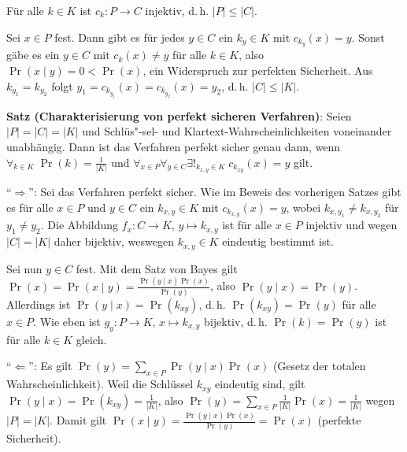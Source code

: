 \begin{Beweis}
    Für alle $k \in K$ ist $c_k\colon P \rightarrow C$ injektiv, d.\,h. $|P| \le |C|$.

    Sei $x \in P$ fest.
    Dann gibt es für jedes $y \in C$ ein $k_y \in K$ mit $c_{k_y}(x) = y$.
    Sonst gäbe es ein $y \in C$ mit $c_k(x) \not= y$ für alle $k \in K$,
    also $\Pr(x \;|\; y) = 0 < \Pr(x)$, ein Widerspruch zur perfekten Sicherheit.
    Aus $k_{y_1} = k_{y_2}$ folgt $y_1 = c_{k_{y_1}}(x) = c_{k_{y_2}}(x) = y_2$,
    d.\,h. $|C| \le |K|$.
\end{Beweis}

\linie

\textbf{Satz (Charakterisierung von perfekt sicheren Verfahren)}:
Seien  $|P| = |C| = |K|$ und Schlüs"-sel- und Klartext-Wahrscheinlichkeiten voneinander unabhängig.
Dann ist das Verfahren perfekt sicher genau dann, wenn
$\forall_{k \in K}\; \Pr(k) = \frac{1}{|K|}$ und
$\forall_{x \in P} \forall_{y \in C} \exists!_{k_{x,y} \in K}\; c_{k_{xy}}(x) = y$ gilt.

\begin{Beweis}
    "`$\Rightarrow$"':
    Sei das Verfahren perfekt sicher.
    Wie im Beweis des vorherigen Satzes gibt es für alle $x \in P$ und $y \in C$ ein
    $k_{x,y} \in K$ mit $c_{k_{x,y}}(x) = y$,
    wobei $k_{x,y_1} \not= k_{x,y_2}$ für $y_1 \not= y_2$.
    Die Abbildung $f_x\colon C \rightarrow K$, $y \mapsto k_{x,y}$ ist für alle $x \in P$
    injektiv und wegen $|C| = |K|$ daher bijektiv, weswegen $k_{x,y} \in K$ eindeutig bestimmt ist.

    Sei nun $y \in C$ fest.
    Mit dem Satz von Bayes gilt $\Pr(x) = \Pr(x \;|\; y) = \frac{\Pr(y \;|\; x) \Pr(x)}{\Pr(y)}$,
    also $\Pr(y \;|\; x) = \Pr(y)$.
    Allerdings ist $\Pr(y \;|\; x) = \Pr(k_{xy})$, d.\,h.
    $\Pr(k_{xy}) = \Pr(y)$ für alle $x \in P$.
    Wie eben ist $g_y\colon P \rightarrow K$, $x \mapsto k_{x,y}$ bijektiv, d.\,h.
    $\Pr(k) = \Pr(y)$ ist für alle $k \in K$ gleich.

    "`$\Leftarrow$"':
    Es gilt $\Pr(y) = \sum_{x \in P} \Pr(y \;|\; x) \Pr(x)$
    (Gesetz der totalen Wahrscheinlichkeit).
    Weil die Schlüssel $k_{xy}$ eindeutig sind, gilt
    $\Pr(y \;|\; x) = \Pr(k_{xy}) = \frac{1}{|K|}$, also
    $\Pr(y) = \sum_{x \in P} \frac{1}{|K|} \Pr(x) = \frac{1}{|K|}$ wegen $|P| = |K|$.
    Damit gilt $\Pr(x \;|\; y) = \frac{\Pr(y \;|\; x) \Pr(x)}{\Pr(y)} = \Pr(x)$
    (perfekte Sicherheit).
\end{Beweis}

\pagebreak

